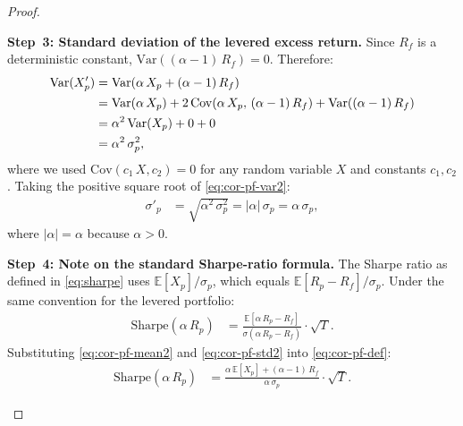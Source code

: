 \documentclass[12pt,openany]{book}
\newcommand{\E}{\mathbb{E}}
\numberwithin{equation}{chapter}
\theoremstyle{plain}
\theoremstyle{definition}
\theoremstyle{remark}
\numberwithin{equation}{chapter}
\theoremstyle{plain}
\begin{document}
\begin{proof}
\begin{enumerate}
        \noindent
        \textbf{Step~3: Standard deviation of the levered
        excess return.}
        Since $R_f$ is a deterministic constant,
        $\mathrm{Var}((\alpha-1)\,R_f) = 0$.  Therefore:
        \begin{align}
          \mathrm{Var}(X'_p)
            &= \mathrm{Var}\!\left(
                 \alpha\,X_p + (\alpha-1)\,R_f
               \right) \notag \\
            &= \mathrm{Var}(\alpha\,X_p)
               + 2\,\mathrm{Cov}(\alpha\,X_p,\,
                    (\alpha-1)\,R_f)
               + \mathrm{Var}((\alpha-1)\,R_f)
               \notag \\
            &= \alpha^{2}\,\mathrm{Var}(X_p)
               + 0 + 0 \notag \\
            &= \alpha^{2}\,\sigma_p^{2},
          \label{eq:cor-pf-var2}
        \end{align}
        where we used $\mathrm{Cov}(c_1\,X, c_2) = 0$ for
        any random variable $X$ and constants $c_1, c_2$.
        Taking the positive square root of
        \eqref{eq:cor-pf-var2}:
        \begin{align}
          \sigma'_p
            &= \sqrt{\alpha^{2}\,\sigma_p^{2}}
             = |\alpha|\,\sigma_p
             = \alpha\,\sigma_p,
          \label{eq:cor-pf-std2}
        \end{align}
        where $|\alpha| = \alpha$ because $\alpha > 0$.

        \noindent
        \textbf{Step~4: Note on the standard
        Sharpe-ratio formula.}
        The Sharpe ratio as defined in \eqref{eq:sharpe}
        uses $\E[X_p]/\sigma_p$, which equals
        $\E[R_p - R_f]/\sigma_p$.  Under the same
        convention for the levered portfolio:
        \begin{align}
          \mathrm{Sharpe}(\alpha\,R_p)
            &= \frac{\E[\alpha\,R_p - R_f]}
                    {\sigma(\alpha\,R_p - R_f)}
               \cdot\sqrt{T}.
          \label{eq:cor-pf-def}
        \end{align}
        Substituting \eqref{eq:cor-pf-mean2} and
        \eqref{eq:cor-pf-std2} into \eqref{eq:cor-pf-def}:
        \begin{align}
          \mathrm{Sharpe}(\alpha\,R_p)
            &= \frac{
                 \alpha\,\E[X_p] + (\alpha-1)\,R_f
               }{
                 \alpha\,\sigma_p
               }
               \cdot\sqrt{T}.
          \label{eq:cor-pf-sub}
        \end{align}


\end{enumerate}
\end{proof}
\end{document}
